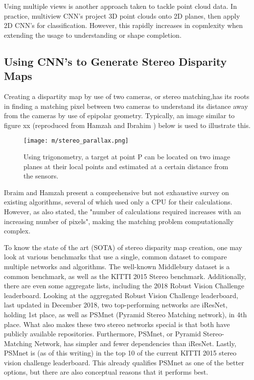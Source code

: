 Using multiple views is another approach taken to tackle point cloud data. In practice, multiview CNN's project 3D point clouds onto 2D planes, then apply 2D CNN's for classification. However, this rapidly increases in copmlexity when extending the usage to understanding or shape completion. 

\subsection{Using CNN's to Generate Stereo Disparity Maps}
Creating a dispartity map by use of two cameras, or stereo matching,has its roots in finding a matching pixel between two cameras to understand its distance away from the cameras by use of epipolar geometry. Typically, an image similar to figure xx (reproduced from Hamzah and Ibrahim \cite{hamzah_literature_2016}) below is used to illustrate this. 

\begin{figure}[h] %
    \centering
    \texttt{[image: m/stereo\_parallax.png]}
    \caption{Using trigonometry, a target at point P can be located on two image planes at their local points and estimated at a certain distance from the sensors.}
\end{figure}

Ibraim and Hamzah \cite{hamzah_literature_2016} present a comprehensive but not exhaustive survey on existing algorithms, several of which used only a CPU for their calculations. However, as also stated, the "number of calculations required increases with an increasing number of pixels", making the matching problem computationally complex. 

To know the state of the art (SOTA) of stereo disparity map creation, one may look at various benchmarks that use a single, common dataset to compare multiple networks and algorithms. The well-known Middlebury \cite{scharstein2014high,middlebury_leaderboard} dataset is a common benchmark, as well as the KITTI \cite{geiger_are_2012,kitti_leaderboard} 2015 Stereo benchmark. Additionally, there are even some aggregate lists, including the 2018 Robust Vision Challenge \cite{rvc_leaderboard} leaderboard. Looking at the aggregated Robust Vision Challenge leaderboard, last updated in December 2018, two top-performing networks are iResNet, holding 1st place, as well as PSMnet (Pyramid Stereo Matching network), in 4th place. What also makes these two stereo networks special is that both have publicly available repositories. Furthermore, PSMnet, or Pyramid Stereo-Matching Network, has simpler and fewer dependencies than iResNet. Lastly, PSMnet is (as of this writing) in the top 10 of the current KITTI 2015 stereo vision challenge leaderboard. This already qualifies PSMnet as one of the better options, but there are also conceptual reasons that it performs best. 



